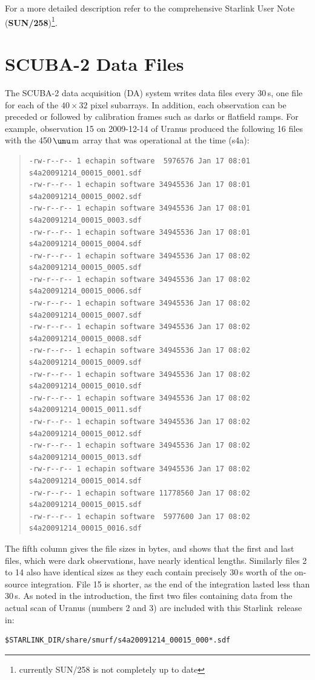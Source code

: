 \documentclass[twoside,11pt]{article}
\newcommand{\micron}{\mbox{\,${\umu}$m}}            %
\newcommand{\htmladdnormallink}[2]{#1}
\newcommand{\xref}[3]{#1}
\newcommand{\xlabel}[1]{}
\renewcommand{\_}{\texttt{\symbol{95}}}
\newenvironment{myquote}{\begin{quote}\begin{small}}{\end{small}\end{quote}}
\newcommand{\starlink}{\htmladdnormallink{Starlink}{http://starlink.jach.hawaii.edu}}
\begin{document}
For a more detailed description refer to the comprehensive Starlink
User Note (\xref{\textbf{SUN/258}}{sun258}{})\footnote{currently
  SUN/258 is not completely up to date}.


\section{\xlabel{data_files}SCUBA-2 Data Files}
\label{sec:data}

The SCUBA-2 data acquisition (DA) system writes data files every
30\,s, one file for each of the $40\times32$ pixel subarrays. In
addition, each observation can be preceded or followed by calibration
frames such as darks or flatfield ramps. For example, observation 15
on 2009-12-14 of Uranus produced the following 16 files with the
450\micron\ array that was operational at the time (s4a):

\begin{myquote}
\begin{verbatim}
-rw-r--r-- 1 echapin software  5976576 Jan 17 08:01 s4a20091214_00015_0001.sdf
-rw-r--r-- 1 echapin software 34945536 Jan 17 08:01 s4a20091214_00015_0002.sdf
-rw-r--r-- 1 echapin software 34945536 Jan 17 08:01 s4a20091214_00015_0003.sdf
-rw-r--r-- 1 echapin software 34945536 Jan 17 08:01 s4a20091214_00015_0004.sdf
-rw-r--r-- 1 echapin software 34945536 Jan 17 08:02 s4a20091214_00015_0005.sdf
-rw-r--r-- 1 echapin software 34945536 Jan 17 08:02 s4a20091214_00015_0006.sdf
-rw-r--r-- 1 echapin software 34945536 Jan 17 08:02 s4a20091214_00015_0007.sdf
-rw-r--r-- 1 echapin software 34945536 Jan 17 08:02 s4a20091214_00015_0008.sdf
-rw-r--r-- 1 echapin software 34945536 Jan 17 08:02 s4a20091214_00015_0009.sdf
-rw-r--r-- 1 echapin software 34945536 Jan 17 08:02 s4a20091214_00015_0010.sdf
-rw-r--r-- 1 echapin software 34945536 Jan 17 08:02 s4a20091214_00015_0011.sdf
-rw-r--r-- 1 echapin software 34945536 Jan 17 08:02 s4a20091214_00015_0012.sdf
-rw-r--r-- 1 echapin software 34945536 Jan 17 08:02 s4a20091214_00015_0013.sdf
-rw-r--r-- 1 echapin software 34945536 Jan 17 08:02 s4a20091214_00015_0014.sdf
-rw-r--r-- 1 echapin software 11778560 Jan 17 08:02 s4a20091214_00015_0015.sdf
-rw-r--r-- 1 echapin software  5977600 Jan 17 08:02 s4a20091214_00015_0016.sdf
\end{verbatim}
\end{myquote}

The fifth column gives the file sizes in bytes, and shows that the
first and last files, which were dark observations, have nearly
identical lengths. Similarly files 2 to 14 also have identical sizes
as they each contain precisely 30\,s worth of the on-source
integration. File 15 is shorter, as the end of the integration lasted
less than 30\,s.  As noted in the introduction, the first two files
containing data from the actual scan of Uranus (numbers 2 and 3) are
included with this \starlink\ release in:
\begin{verbatim}
$STARLINK_DIR/share/smurf/s4a20091214_00015_000*.sdf
\end{verbatim}
\end{document}
